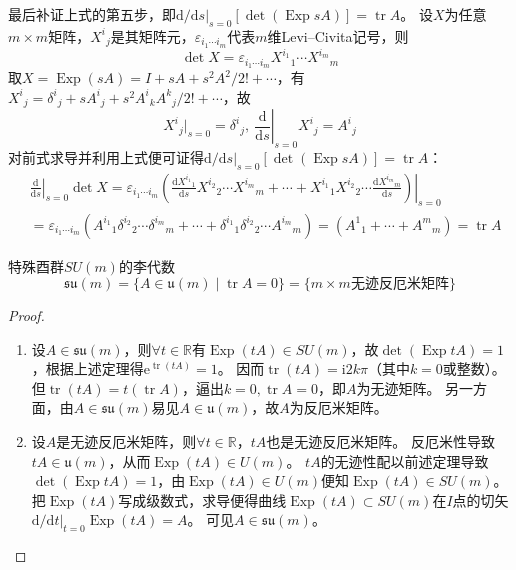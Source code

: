 最后补证上式的第五步，即$\mathrm{d} / \mathrm{d}s|_{s = 0}[\det(\operatorname{Exp}sA)] = \operatorname{tr}A$。
设$X$为任意$m \times m$矩阵，$X^i{}_j$是其矩阵元，$\varepsilon_{i_1 \cdots i_m}$代表$m$维Levi--Civita记号，则
$$\det X = \varepsilon_{i_1 \cdots i_m}X^{i_1}{}_1 \cdots X^{i_m}{}_m$$
取$X = \operatorname{Exp}(sA) = I + sA + s^2A^2 / 2! + \cdots$，有$X^i{}_j = \delta^i{}_j + sA^i{}_j + s^2A^i{}_kA^k{}_j / 2! + \cdots$，故
$$X^i{}_j|_{s = 0} = \delta^i{}_j, ~ \left.\frac{\mathrm{d}}{\mathrm{d}s}\right|_{s = 0}X^i{}_j = A^i{}_j$$
对前式求导并利用上式便可证得$\mathrm{d} / \mathrm{d}s|_{s = 0}[\det(\operatorname{Exp}sA)] = \operatorname{tr}A$：
\[\begin{split}
    & \left.\frac{\mathrm{d}}{\mathrm{d}s}\right|_{s = 0}\det X = \varepsilon_{i_1 \cdots i_m}\left.\left(\frac{\mathrm{d}X^{i_1}{}_1}{\mathrm{d}s}X^{i_2}{}_2 \cdots X^{i_m}{}_m + \cdots + X^{i_1}{}_1X^{i_2}{}_2 \cdots \frac{\mathrm{d}X^{i_m}{}_m}{\mathrm{d}s}\right)\right|_{s = 0} \\
    & = \varepsilon_{i_1 \cdots i_m}(A^{i_1}{}_1\delta^{i_2}{}_2 \cdots \delta^{i_m}{}_m + \cdots + \delta^{i_1}{}_1\delta^{i_2}{}_2 \cdots A^{i_m}{}_m) = (A^1{}_1 + \cdots + A^m{}_m) = \operatorname{tr}A
\end{split}\]

\begin{theorem}
    特殊酉群$SU(m)$的李代数
    $$\mathfrak{su}(m) = \{A \in \mathfrak{u}(m) \mid \operatorname{tr}A = 0\} = \{m \times m \text{无迹反厄米矩阵}\}$$
\end{theorem}

\begin{proof}
    \begin{enumerate}[（A）]
        \item 设$A \in \mathfrak{su}(m)$，则$\forall t \in \mathbb{R}$有$\operatorname{Exp}(tA) \in SU(m)$，故$\det(\operatorname{Exp}tA) = 1$，根据上述定理得$\mathrm{e}^{\operatorname{tr}(tA)} = 1$。
        因而$\operatorname{tr}(tA) = \mathrm{i}2k\pi$（其中$k = 0$或整数）。
        但$\operatorname{tr}(tA) = t(\operatorname{tr}A)$，逼出$k = 0, \operatorname{tr}A = 0$，即$A$为无迹矩阵。
        另一方面，由$A \in \mathfrak{su}(m)$易见$A \in \mathfrak{u}(m)$，故$A$为反厄米矩阵。
        \item 设$A$是无迹反厄米矩阵，则$\forall t \in \mathbb{R}$，$tA$也是无迹反厄米矩阵。
        反厄米性导致$tA \in \mathfrak{u}(m)$，从而$\operatorname{Exp}(tA) \in U(m)$。
        $tA$的无迹性配以前述定理导致$\det(\operatorname{Exp}tA) = 1$，由$\operatorname{Exp}(tA) \in U(m)$便知$\operatorname{Exp}(tA) \in SU(m)$。
        把$\operatorname{Exp}(tA)$写成级数式，求导便得曲线$\operatorname{Exp}(tA) \subset SU(m)$在$I$点的切矢$\mathrm{d} / \mathrm{d}t|_{t = 0}\operatorname{Exp}(tA) = A$。
        可见$A \in \mathfrak{su}(m)$。
    \end{enumerate}
\end{proof}

